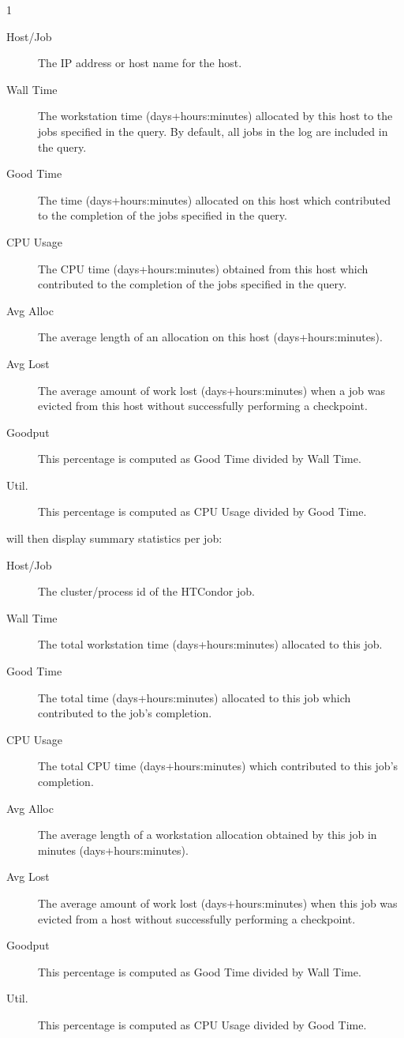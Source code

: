 \begin{ManPage}{\label{man-condor-userlog}}{1}
\begin{description}
\item[Host/Job] The IP address or host name for the host.
\item[Wall Time] The workstation time (days+hours:minutes) allocated by
this host to the jobs specified in the query.  By default, all jobs in
the log are included in the query.
\item[Good Time] The time (days+hours:minutes) allocated on this host which
contributed to the completion of the jobs specified in the query.
\item[CPU Usage] The CPU time (days+hours:minutes) obtained from this
host which
contributed to the completion of the jobs specified in the query.
\item[Avg Alloc] The average length of an allocation on this host
(days+hours:minutes).
\item[Avg Lost] The average amount of work lost (days+hours:minutes) when a job
was evicted from this host without successfully performing a checkpoint.
\item[Goodput] This percentage is computed as Good Time divided by
Wall Time.
\item[Util.] This percentage is computed as CPU Usage divided by Good
Time.
\end{description}

 will then display summary statistics per job:

\begin{description}
\item[Host/Job] The cluster/process id of the HTCondor job.
\item[Wall Time] The total workstation time (days+hours:minutes) allocated to
this job.
\item[Good Time] The total time (days+hours:minutes) allocated to this
job which 
contributed to the job's completion.
\item[CPU Usage] The total CPU time (days+hours:minutes) which
contributed to this 
job's completion.
\item[Avg Alloc] The average length of a workstation allocation
obtained by this job in minutes (days+hours:minutes).
\item[Avg Lost] The average amount of work lost (days+hours:minutes)
when this job 
was evicted from a host without successfully performing a checkpoint.
\item[Goodput] This percentage is computed as Good Time divided by
Wall Time.
\item[Util.] This percentage is computed as CPU Usage divided by Good
Time.
\end{description}


\end{ManPage}
